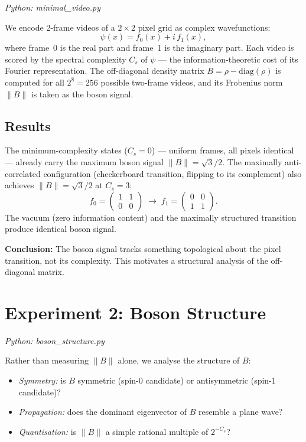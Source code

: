 \documentclass[11pt]{article}
\begin{document}
\textit{Python: minimal\_video.py}

We encode 2-frame videos of a $2\times 2$ pixel grid as complex wavefunctions:
\[
  \psi(x) = f_0(x) + i\,f_1(x),
\]
where frame~0 is the real part and frame~1 is the imaginary part.
Each video is scored by the spectral complexity $C_s$ of $\psi$ --- the
information-theoretic cost of its Fourier representation.
The off-diagonal density matrix $B = \rho - \mathrm{diag}(\rho)$ is computed
for all $2^8 = 256$ possible two-frame videos, and its Frobenius norm
$\|B\|$ is taken as the boson signal.

\subsection*{Results}

The minimum-complexity states ($C_s = 0$) --- uniform frames, all pixels
identical --- already carry the maximum boson signal $\|B\| = \sqrt{3}/2$.
The maximally anti-correlated configuration (checkerboard transition, flipping
to its complement) also achieves $\|B\| = \sqrt{3}/2$ at $C_s = 3$:
\[
  f_0 = \begin{pmatrix}1&1\\0&0\end{pmatrix}
  \;\longrightarrow\;
  f_1 = \begin{pmatrix}0&0\\1&1\end{pmatrix}.
\]
The vacuum (zero information content) and the maximally structured transition
produce identical boson signal.

\textbf{Conclusion:} The boson signal tracks something topological about the
pixel transition, not its complexity. This motivates a structural analysis of
the off-diagonal matrix.

\section{Experiment 2: Boson Structure}
\label{sec:exp2}

\textit{Python: boson\_structure.py}

Rather than measuring $\|B\|$ alone, we analyse the structure of $B$:
\begin{itemize}
  \item \emph{Symmetry:} is $B$ symmetric (spin-0 candidate) or
        antisymmetric (spin-1 candidate)?
  \item \emph{Propagation:} does the dominant eigenvector of $B$ resemble a
        plane wave?
  \item \emph{Quantisation:} is $\|B\|$ a simple rational multiple of
        $2^{-C_s}$?
\end{itemize}
\end{document}

